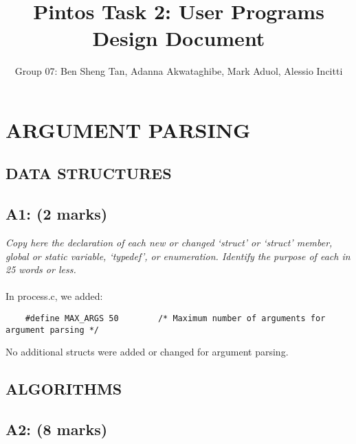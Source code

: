 \documentclass{article}
\title{Pintos Task 2: User Programs Design Document}
\author{Group 07: Ben Sheng Tan, Adanna Akwataghibe, Mark Aduol, Alessio Incitti }
\begin{document}
\maketitle

\section{ARGUMENT PARSING}

\subsection{ DATA STRUCTURES}

\subsection*{A1: (2 marks) }

\textit{Copy here the declaration of each new or changed ‘struct’ or ‘struct’ member, global or static variable, ‘typedef’, or enumeration. Identify the purpose of each in 25 words or less.}
\\ \\
In process.c, we added:
\begin{lstlisting}
	#define MAX_ARGS 50		   /* Maximum number of arguments for argument parsing */
\end{lstlisting}
No additional structs were added or changed for argument parsing.

\subsection{ALGORITHMS}

\subsection*{A2: (8 marks) }
\end{document}
